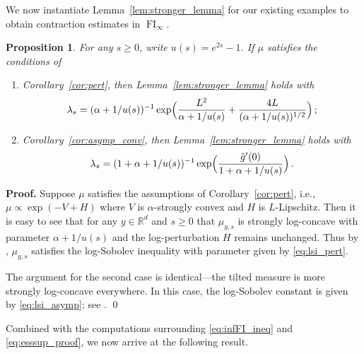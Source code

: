 \documentclass[12pt]{article}
\newcommand{\RR}{\mathbb{R}}
\newcommand{\R}{\RR}
\newcommand{\1}{\mathds{1}}
\renewenvironment{proof}{\noindent\textbf{Proof.}\hspace*{.3em}}{\qed \vspace{.1in}}
\newcommand{\infFI}{\operatorname{FI}_\infty}
\theoremstyle{plain}
\newtheorem{proposition}[theorem]{Proposition}
\theoremstyle{definition}
\theoremstyle{remark}
\begin{document}
We now instantiate Lemma~\ref{lem:stronger_lemma} for our existing examples to obtain contraction estimates in $\infFI$.
\begin{proposition}\label{prop:stronger_prop}
For any $s \geq 0$, write $u(s) = e^{2s}-1$. If $\mu$ satisfies the conditions of
\begin{enumerate}
    \item[(a)] Corollary~\ref{cor:pert}, then Lemma~\ref{lem:stronger_lemma} holds with 
    \begin{align}\label{eq:lsi_pert}
            \lambda_{s} = (\alpha + 1/u(s))^{-1}\exp\Bigl(\frac{L^2}{\alpha+1/u(s)} + \frac{4L}{(\alpha+1/u(s))^{1/2}}\Bigr)\,;
    \end{align}
    \item[(b)] Corollary~\ref{cor:asymp_conv}, then Lemma~\ref{lem:stronger_lemma} holds with 
\begin{align}\label{eq:lsi_asymp}
    \lambda_s = (1 + \alpha + 1/u(s))^{-1}\exp\Bigl(\frac{\hat g'(0)}{1 + \alpha + 1/u(s)}\Bigr)\,.
\end{align}
\end{enumerate}
\end{proposition}
\begin{proof}
Suppose $\mu$ satisfies the assumptions of Corollary~\ref{cor:pert}, i.e., $\mu\propto\exp(-{V+H})$ where $V$ is $\alpha$-strongly convex and $H$ is $L$-Lipschitz. Then it is easy to see that for any $y \in \R^d$ and $s \geq 0$ that $\mu_{y,s}$ 
is strongly log-concave with parameter $\alpha + 1/u(s)$ and the log-perturbation $H$ remains unchanged. Thus by \cite[Theorem 1.4]{BriPed25HeatFlow}, $\mu_{y,s}$ satisfies the log-Sobolev inequality with parameter given by \eqref{eq:lsi_pert}. 

The argument for the second case is identical---the tilted measure is more strongly log-concave everywhere. In this case, the log-Sobolev constant is given by \eqref{eq:lsi_asymp}; see \cite[Theorem 5.7]{conforti2025projected}.\qedhere
\end{proof}

Combined with the computations surrounding \eqref{eq:infFI_ineq} and \eqref{eq:esssup_proof}, we now arrive at the following result.
\end{document}
